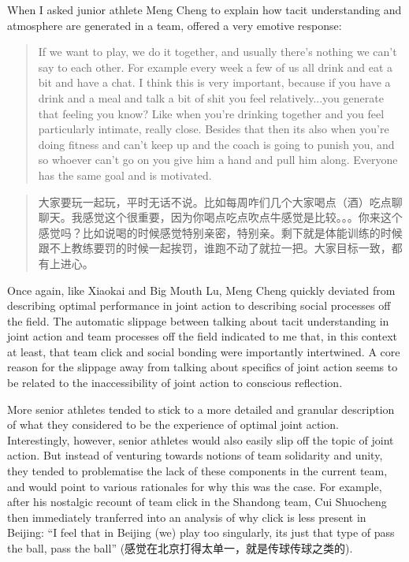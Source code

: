 \begin{CJK}{UTF8}{gbsn}
When I asked junior athlete Meng Cheng to explain how tacit understanding and atmosphere are generated in a team, offered a very emotive response:

      \begin{quote}
        If we want to play, we do it together, and usually there’s nothing we can’t say to each other.  For example every week a few of us all drink and eat a bit and have a chat.  I think this is very important, because if you have a drink and a meal and talk a bit of shit you feel relatively...you generate that feeling you know? Like when you’re drinking together and you feel particularly intimate, really close.  Besides that then its also when you’re doing fitness and can’t keep up and the coach is going to punish you, and so whoever can’t go on you give him a hand and pull him along.  Everyone has the same goal and is motivated.
      \end{quote}

      \begin{quote}
        大家要玩一起玩，平时无话不说。比如每周咋们几个大家喝点（酒）吃点聊聊天。我感觉这个很重要，因为你喝点吃点吹点牛感觉是比较。。。你来这个感觉吗？比如说喝的时候感觉特别亲密，特别亲。剩下就是体能训练的时候跟不上教练要罚的时候一起挨罚，谁跑不动了就拉一把。大家目标一致，都有上进心。 
      \end{quote}

Once again, like Xiaokai and Big Mouth Lu, Meng Cheng quickly deviated from describing optimal performance in joint action to describing social processes off the field.  The automatic slippage between talking about tacit understanding in joint action and team processes off the field indicated to me that, in this context at least, that team click and social bonding were importantly intertwined.  A core reason for the slippage away from talking about specifics of joint action seems to be related to the inaccessibility of joint action to conscious reflection.

More senior athletes tended to stick to a more detailed and granular description of what they considered to be the experience of optimal joint action. Interestingly, however, senior athletes would also easily slip off the topic of joint action.  But instead of venturing towards notions of team solidarity and unity, they tended to problematise the lack of these components in the current team, and would point to various rationales for why this was the case.  For example, after his nostalgic recount of team click in the Shandong team, Cui Shuocheng then immediately tranferred into an analysis of why click is less present in Beijing: ``I feel that in Beijing (we) play too singularly, its just that type of pass the ball, pass the ball''  (感觉在北京打得太单一，就是传球传球之类的).


\end{CJK}
